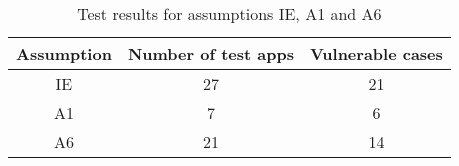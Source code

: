 \begin{table}[t]
\begin{center}
\begin{threeparttable}
\begin{tabular}{|c|c|c|}
\hline
Assumption & Number of test apps & Vulnerable cases \\
\hline
IE & 27 & 21\\
\hline
A1 & 7 & 6\\
\hline
A6 & 21 & 14\\
\hline
\end{tabular}
\end{threeparttable}
\end{center}
\caption{Test results for assumptions IE, A1 and A6}
\label{tab:explicatingTestResults}
\end{table}